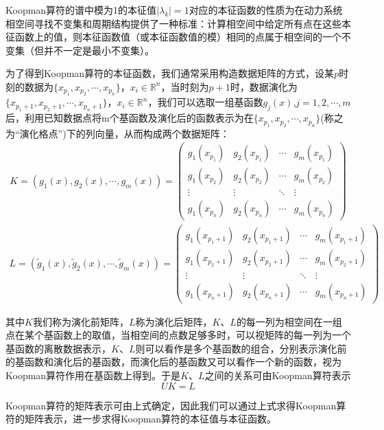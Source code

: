Koopman算符的谱中模为1的本征值$|\lambda_k|=1$对应的本征函数的性质为在动力系统相空间寻找不变集和周期结构提供了一种标准：计算相空间中给定所有点在这些本征函数上的值，则本征函数值（或本征函数值的模）相同的点属于相空间的一个不变集（但并不一定是最小不变集）。

为了得到Koopman算符的本征函数，我们通常采用构造数据矩阵的方式，设某$p$时刻的数据为$\{x_{p_1},x_{p_2},\cdots,x_{p_n}\}$，$x_i\in \mathbb{R}^n$，当时刻为$p+1$时，数据演化为$\{x_{p_1+1},x_{p_2+1},\cdots,x_{p_n+1}\}$，$x_i\in \mathbb{R}^n$，我们可以选取一组基函数${g_j(x)}$,$j=1,2,\cdots,m$后，利用已知数据点将m个基函数及演化后的函数表示为在$\{x_{p_1},x_{p_2},\cdots,x_{p_n}\}$(称之为“演化格点”)下的列向量，从而构成两个数据矩阵：
\begin{gather}
    K=(g_1(x),g_2(x),\cdots,g_m(x))=
    \begin{pmatrix}
    g_1(x_{p_1}) & g_2(x_{p_1}) & \cdots & g_m(x_{p_1}) \\
    g_1(x_{p_2}) & g_2(x_{p_2}) & \cdots & g_m(x_{p_2}) \\
    \vdots       & \vdots       & \ddots & \vdots \\
    g_1(x_{p_n}) & g_2(x_{p_n}) & \cdots & g_m(x_{p_n})
    \end{pmatrix}
\end{gather}
\begin{gather}
    L=(\tilde{g}_1(x),\tilde{g}_2(x),\cdots,\tilde{g}_m(x))=
    \begin{pmatrix}
    g_1(x_{p_1+1}) & g_2(x_{p_1+1}) & \cdots & g_m(x_{p_1+1}) \\
    g_1(x_{p_2+1}) & g_2(x_{p_2+1}) & \cdots & g_m(x_{p_2+1}) \\
    \vdots         & \vdots         & \ddots & \vdots \\
    g_1(x_{p_n+1}) & g_2(x_{p_n+1}) & \cdots & g_m(x_{p_n+1})
    \end{pmatrix}
\end{gather}

其中$K$我们称为演化前矩阵，$L$称为演化后矩阵，$K$、$L$的每一列为相空间在一组点在某个基函数上的取值，当相空间的点数足够多时，可以视矩阵的每一列为一个基函数的离散数据表示，$K$、$L$则可以看作是多个基函数的组合，分别表示演化前的基函数和演化后的基函数，而演化后的基函数又可以看作一个新的函数，视为Koopman算符作用在基函数上得到。于是$K$、$L$之间的关系可由Koopman算符表示
$$UK = L$$

Koopman算符的矩阵表示可由上式确定，因此我们可以通过上式求得Koopman算符的矩阵表示，进一步求得Koopman算符的本征值与本征函数。

